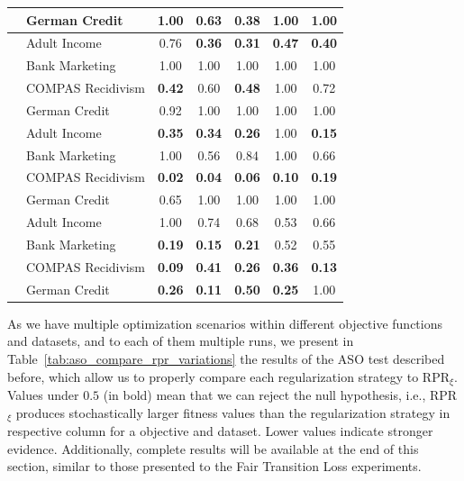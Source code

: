 \begin{table}[ht]
{\begin{tabular}{llccccc}
 & German Credit & 1.00 & 0.63 & \textbf{0.38} & 1.00 & 1.00 \\
\midrule
{} 
 & Adult Income & 0.76 & \textbf{0.36} & \textbf{0.31} & \textbf{0.47} & \textbf{0.40} \\
 & Bank Marketing & 1.00 & 1.00 & 1.00 & 1.00 & 1.00 \\
 & COMPAS Recidivism & \textbf{0.42} & 0.60 & \textbf{0.48} & 1.00 & 0.72 \\
 & German Credit & 0.92 & 1.00 & 1.00 & 1.00 & 1.00 \\
\midrule
{} 
 & Adult Income & \textbf{0.35} & \textbf{0.34} & \textbf{0.26} & 1.00 & \textbf{0.15} \\
 & Bank Marketing & 1.00 & 0.56 & 0.84 & 1.00 & 0.66 \\
 & COMPAS Recidivism & \textbf{0.02} & \textbf{0.04} & \textbf{0.06} & \textbf{0.10} & \textbf{0.19} \\
 & German Credit & 0.65 & 1.00 & 1.00 & 1.00 & 1.00 \\
\midrule
{} 
 & Adult Income & 1.00 & 0.74 & 0.68 & 0.53 & 0.66 \\
 & Bank Marketing & \textbf{0.19} & \textbf{0.15} & \textbf{0.21} & 0.52 & 0.55 \\
 & COMPAS Recidivism & \textbf{0.09} & \textbf{0.41} & \textbf{0.26} & \textbf{0.36} & \textbf{0.13} \\
 & German Credit & \textbf{0.26} & \textbf{0.11} & \textbf{0.50} & \textbf{0.25} & 1.00 \\
\bottomrule
\end{tabular}
    }
\end{table}

As we have multiple optimization scenarios within different objective functions and datasets, and to each of them multiple runs, we present in Table~\ref{tab:aso_compare_rpr_variations} the results of the ASO test described before, which allow us to properly compare each regularization strategy to RPR$_{\xi}$. Values under $0.5$ (in bold) mean that we can reject the null hypothesis, i.e., RPR$_{\xi}$ produces stochastically larger fitness values than the regularization strategy in respective column for a objective and dataset. Lower values indicate stronger evidence. Additionally, complete results will be available at the end of this section, similar to those presented to the Fair Transition Loss experiments.

